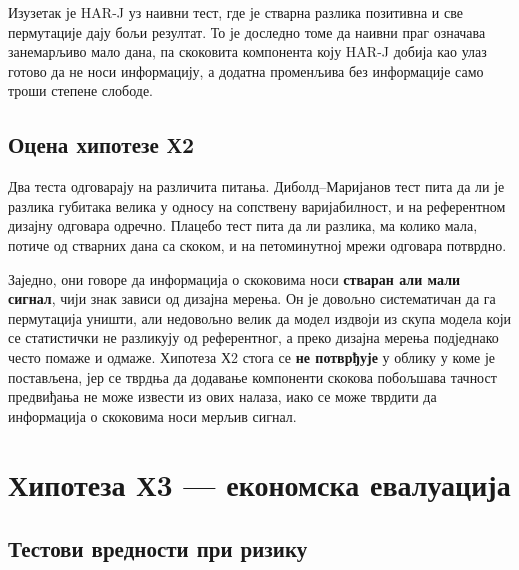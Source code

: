Изузетак је HAR-J уз наивни тест, где је стварна разлика позитивна и све пермутације
дају бољи резултат. То је доследно томе да наивни праг означава занемарљиво мало дана,
па скоковита компонента коју HAR-J добија као улаз готово да не носи информацију, а
додатна променљива без информације само троши степене слободе.

\subsection{Оцена хипотезе Х2}

Два теста одговарају на различита питања. Диболд–Маријанов тест пита да ли је разлика
губитака велика у односу на сопствену варијабилност, и на референтном дизајну одговара
одречно. Плацебо тест пита да ли разлика, ма колико мала, потиче од стварних дана са
скоком, и на петоминутној мрежи одговара потврдно.

Заједно, они говоре да информација о скоковима носи \textbf{стваран али мали сигнал},
чији знак зависи од дизајна мерења. Он је довољно систематичан да га пермутација
уништи, али недовољно велик да модел издвоји из скупа модела који се статистички не
разликују од референтног, а преко дизајна мерења подједнако често помаже и одмаже.
Хипотеза Х2 стога се \textbf{не потврђује} у облику у коме је постављена, јер се тврдња
да додавање компоненти скокова побољшава тачност предвиђања не може извести из ових
налаза, иако се може тврдити да информација о скоковима носи мерљив сигнал.

\section{Хипотеза Х3 — економска евалуација}
\label{sec:rez-h3}

\subsection{Тестови вредности при ризику}

